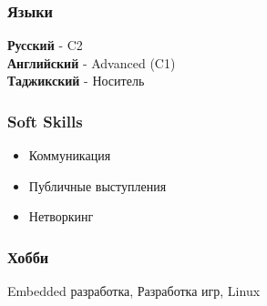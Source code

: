 \documentclass[a4paper,10pt]{article}
\begin{document}
\subsubsection*{Языки}
\textbf{Русский} - C2 \\
\textbf{Английский} - Advanced (C1) \\
\textbf{Таджикский} - Носитель
\subsubsection*{Soft Skills}
\begin{itemize}
    \item Коммуникация
    \item Публичные выступления
    \item Нетворкинг
\end{itemize}
\subsubsection*{Хобби}
Embedded разработка, Разработка игр, Linux
\end{document}
